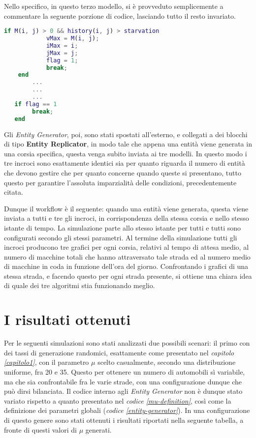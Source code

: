 Nello specifico, in questo terzo modello, si è provveduto semplicemente a commentare la seguente porzione di codice, lasciando tutto il resto invariato.
\newline
\begin{lstlisting}[language=Matlab,label=starvation,caption= Porzione di codice relativa alla gestione della starvation]
    if M(i, j) > 0 && history(i, j) > starvation
            vMax = M(i, j);
            iMax = i;
            jMax = j;
            flag = 1;
            break;
    end
        ...
        ...
        ...
   if flag == 1
        break;
   end
\end{lstlisting}

Gli \textit{Entity Generator}, poi, sono stati spostati all'esterno, e collegati a dei blocchi di tipo \textbf{Entity Replicator\cite{entityreplicator}}, in modo tale che appena una entità viene generata in una corsia specifica, questa venga subito inviata ai tre modelli. In questo modo i tre incroci sono esattamente identici sia per quanto riguarda il numero di entità che devono gestire che per quanto concerne quando queste si presentano, tutto questo per garantire l'assoluta imparzialità delle condizioni, precedentemente citata.
\newline

Dunque il workflow è il seguente: quando una entità viene generata, questa viene inviata a tutti e tre gli incroci, in corrispondenza della stessa corsia e nello stesso istante di tempo. La simulazione parte allo stesso istante per tutti e tutti sono configurati secondo gli stessi parametri. Al termine della simulazione tutti gli incroci producono tre grafici per ogni corsia, relativi al tempo di attesa medio, al numero di macchine totali che hanno attraversato tale strada ed al numero medio di macchine in coda in funzione dell'ora del giorno. Confrontando i grafici di una stessa strada, e facendo questo per ogni strada presente, si ottiene una chiara idea di quale dei tre algoritmi stia funzionando meglio.

\newpage

\section{I risultati ottenuti}
Per le seguenti simulazioni sono stati analizzati due possibili scenari: il primo con dei tassi di generazione randomici, esattamente come presentato nel \textit{capitolo \ref{capitolo1}}, con il parametro $\mu$ scelto casualmente, secondo una distribuzione uniforme, fra 20 e 35. Questo per ottenere un numero di automobili sì variabile, ma che sia confrontabile fra le varie strade, con una configurazione dunque che può dirsi bilanciata. Il codice interno agli \textit{Entity Generator} non è dunque stato variato rispetto a quanto presentato nel \textit{codice \ref{mu-definition}}, così come la definizione dei parametri globali (\textit{codice \ref{entity-generator}}). In una configurazione di questo genere sono stati ottenuti i risultati riportati nella seguente tabella, a fronte di questi valori di $\mu$ generati.
\newline

